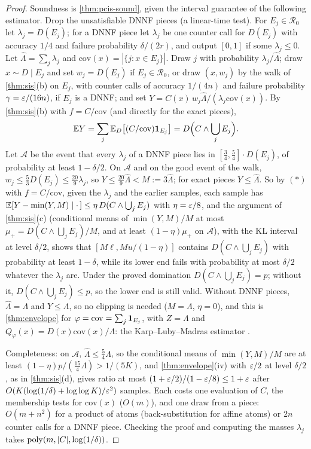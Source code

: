 \begin{proof}
Soundness is \cref{thm:pcis-sound}, given the interval guarantee of the
following estimator. Drop the unsatisfiable DNNF pieces (a linear-time test).
For $E_j\in\mathcal R_0$ let $\lambda_j=D(E_j)$; for a DNNF piece let $\lambda_j$ be one
counter call for $D(E_j)$ with accuracy $1/4$ and failure probability
$\delta/(2r)$, and output $[0,1]$ if some $\lambda_j\le0$. Let
$\hat\Lambda=\sum_j\lambda_j$ and $\mathrm{cov}(x)=|\{j:x\in E_j\}|$. Draw $j$ with
probability $\lambda_j/\hat\Lambda$; draw $x\sim D\mid E_j$ and set $w_j=D(E_j)$ if
$E_j\in\mathcal R_0$, or draw $(x,w_j)$ by the walk of \cref{thm:sis}(b) on $E_j$,
with counter calls of accuracy $1/(4n)$ and failure probability
$\gamma=\varepsilon/(16n)$, if $E_j$ is a DNNF; and set
$Y=C(x)\,w_j\hat\Lambda/(\lambda_j\mathrm{cov}(x))$. By \cref{thm:sis}(b) with
$f=C/\mathrm{cov}$ (and directly for the exact pieces),
\[
\mathbb{E} Y=\sum_j\mathbb{E}_D\big[(C/\mathrm{cov})\mathbf{1}_{E_j}\big]=D\Big(C\wedge\bigcup_jE_j\Big).
\]
Let $\mathcal A$ be the event that every $\lambda_j$ of a DNNF piece lies in
$[\frac34,\frac54]\cdot D(E_j)$, of probability at least $1-\delta/2$. On $\mathcal A$
and on the good event of the walk, $w_j\le\frac53D(E_j)\le\frac{20}9\lambda_j$, so
$Y\le\frac{20}9\hat\Lambda<M:=3\hat\Lambda$; for exact pieces $Y\le\hat\Lambda$. So by
$(\ast)$ with $f=C/\mathrm{cov}$, given the $\lambda_j$ and the earlier samples, each
sample has $\mathbb{E}[Y-\min(Y,M)\mid\cdot\,]\le\eta\,D(C\wedge\bigcup_jE_j)$ with $\eta=\varepsilon/8$,
and the argument of \cref{thm:sis}(c) (conditional means of $\min(Y,M)/M$ at most
$\mu_+=D(C\wedge\bigcup_jE_j)/M$, and at least $(1-\eta)\mu_+$ on $\mathcal A$), with the
KL interval at level $\delta/2$, shows that $[M\ell,Mu/(1-\eta)]$ contains
$D(C\wedge\bigcup_jE_j)$ with probability at least $1-\delta$, while its lower end
fails with probability at most $\delta/2$ whatever the $\lambda_j$ are. Under the
proved domination $D(C\wedge\bigcup_jE_j)=p$; without it,
$D(C\wedge\bigcup_jE_j)\le p$, so the lower end is still valid. Without DNNF
pieces, $\hat\Lambda=\Lambda$ and $Y\le\Lambda$, so no clipping is needed ($M=\Lambda$,
$\eta=0$), and this is \cref{thm:envelope} for $\varphi=\mathrm{cov}=\sum_j\mathbf{1}_{E_j}$,
with $Z=\Lambda$ and $Q_\varphi(x)=D(x)\mathrm{cov}(x)/\Lambda$: the Karp--Luby--Madras
estimator \cite{klm1989}.

Completeness: on $\mathcal A$, $\hat\Lambda\le\frac54\Lambda$, so the conditional means
of $\min(Y,M)/M$ are at least $(1-\eta)p/(\frac{15}4\Lambda)>1/(5K)$, and
\cref{thm:envelope}(iv) with $\varepsilon/2$ at level $\delta/2$, as in \cref{thm:sis}(d),
gives ratio at most
$(1+\varepsilon/2)/(1-\varepsilon/8)\le1+\varepsilon$ after $O(K(\log(1/\delta)+\log\log K)/\varepsilon^2)$
samples. Each costs one evaluation of $C$, the membership tests for
$\mathrm{cov}(x)$ ($O(m)$), and one draw from a piece: $O(m+n^2)$ for a product of
atoms (back-substitution for affine atoms) or $2n$ counter calls for a DNNF piece.
Checking the proof and computing the masses $\lambda_j$ takes
$\mathrm{poly}(m,|C|,\log(1/\delta))$.
\end{proof}


